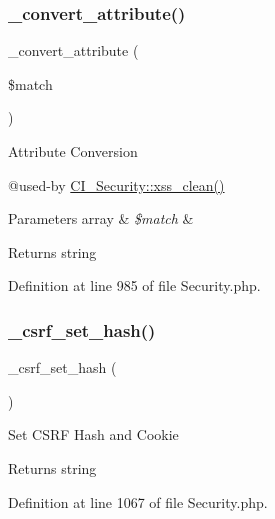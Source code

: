 \subsubsection{\texorpdfstring{\_convert\_attribute()}{\_convert\_attribute()}}
{\footnotesize\ttfamily \+\_\+convert\+\_\+attribute (\begin{DoxyParamCaption}\item[{}]{\$match }\end{DoxyParamCaption})\hspace{0.3cm}{\ttfamily [protected]}}

Attribute Conversion

@used-\/by \mbox{\hyperlink{class_c_i___security_acb759426dbab128d3d8164805225381c}{C\+I\+\_\+\+Security\+::xss\+\_\+clean()}} 
\begin{DoxyParams}[1]{Parameters}
array & {\em \$match} & \\
\hline
\end{DoxyParams}
\begin{DoxyReturn}{Returns}
string 
\end{DoxyReturn}


Definition at line 985 of file Security.\+php.

\mbox{\label{class_c_i___security_a7064dd5501c1dfab05ba6ac8838beb01}} 
\subsubsection{\texorpdfstring{\_csrf\_set\_hash()}{\_csrf\_set\_hash()}}
{\footnotesize\ttfamily \+\_\+csrf\+\_\+set\+\_\+hash (\begin{DoxyParamCaption}{ }\end{DoxyParamCaption})\hspace{0.3cm}{\ttfamily [protected]}}

Set C\+S\+RF Hash and Cookie

\begin{DoxyReturn}{Returns}
string 
\end{DoxyReturn}


Definition at line 1067 of file Security.\+php.

\mbox{\label{class_c_i___security_a5289832cb3ae9cee3c12e82ede958874}} 
